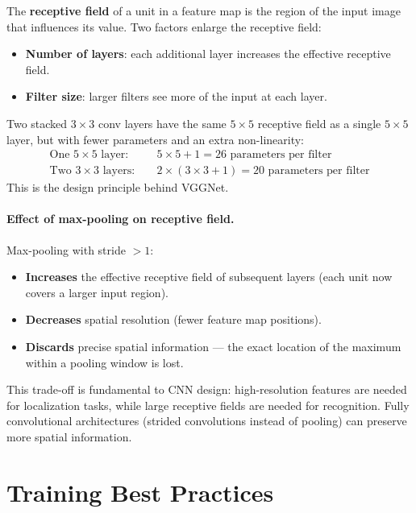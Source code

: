 \documentclass[11pt,a4paper]{article}
\theoremstyle{definition}
\theoremstyle{plain}
\theoremstyle{remark}
\begin{document}
The \textbf{receptive field} of a unit in a feature map is the region of the input image that influences its value.
Two factors enlarge the receptive field:
\begin{itemize}
    \item \textbf{Number of layers}: each additional layer increases the effective receptive field.
    \item \textbf{Filter size}: larger filters see more of the input at each layer.
\end{itemize}

\begin{tcolorbox}[colback=green!5!white,colframe=green!75!black,title=\textbf{Parameter Efficiency: Stacked Small Filters}]
Two stacked $3 \times 3$ conv layers have the same $5 \times 5$ receptive field as a single $5 \times 5$ layer, but with fewer parameters and an extra non-linearity:
\begin{align*}
    \text{One } 5\times5 \text{ layer}: &\quad 5 \times 5 + 1 = 26 \text{ parameters per filter} \\
    \text{Two } 3\times3 \text{ layers}: &\quad 2 \times (3 \times 3 + 1) = 20 \text{ parameters per filter}
\end{align*}
This is the design principle behind VGGNet.
\end{tcolorbox}

\paragraph{Effect of max-pooling on receptive field.}
Max-pooling with stride $> 1$:
\begin{itemize}
    \item \textbf{Increases} the effective receptive field of subsequent layers (each unit now covers a larger input region).
    \item \textbf{Decreases} spatial resolution (fewer feature map positions).
    \item \textbf{Discards} precise spatial information --- the exact location of the maximum within a pooling window is lost.
\end{itemize}
This trade-off is fundamental to CNN design: high-resolution features are needed for localization tasks, while large receptive fields are needed for recognition. Fully convolutional architectures (strided convolutions instead of pooling) can preserve more spatial information.


\section{Training Best Practices}
\end{document}
